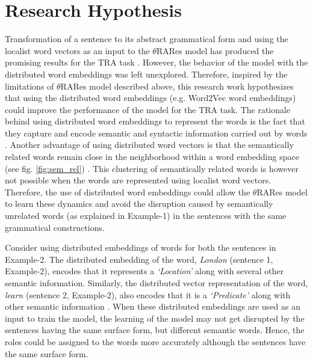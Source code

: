 \section{Research Hypothesis}

Transformation of a sentence to its abstract grammatical form and using the localist word vectors as an input to the $\theta$RARes model has produced the promising results for the TRA task \cite{xavier:2013:RT, tra:xavier_wermter:2014, tra:xavier_hri}. However, the behavior of the model with the distributed word embeddings was left unexplored. Therefore, inspired by the limitations of $\theta$RARes model described above, this research work hypothesizes that using the distributed word embeddings (e.g. Word2Vec word embeddings) could improve the performance of the model for the TRA task. The rationale behind using distributed word embeddings to represent the words is the fact that they capture and encode semantic and syntactic information carried out by words \cite{w2v:mikolov_2013_distributed, w2v:regularities_in_word_representations}. Another advantage of using distributed word vectors is that the semantically related words remain close in the neighborhood within a word embedding space (see fig. \ref{fig:sem_rel}) \cite{w2v:mikolov_2013_distributed}. This clustering of semantically related words is however not possible when the words are represented using localist word vectors. Therefore, the use of distributed word embeddings could allow the $\theta$RARes model to learn these dynamics and avoid the disruption caused by semantically unrelated words (as explained in Example-1) in the sentences with the same grammatical constructions.

Consider using distributed embeddings of words for both the sentences in Example-2. The distributed embedding of the word, \textit{London} (sentence 1, Example-2), encodes that it represents a \textit{`Location'} along with several other semantic information. Similarly, the distributed vector representation of the word, \textit{learn} (sentence 2, Example-2), also encodes that it is a \textit{`Predicate'} along with other semantic information \cite{w2v:mikolov_2013_efficient}. When these distributed embeddings are used as an input to train the model, the learning of the model may not get disrupted by the sentences having the same surface form, but different semantic words. Hence, the roles could be assigned to the words more accurately although the sentences have the same surface form.